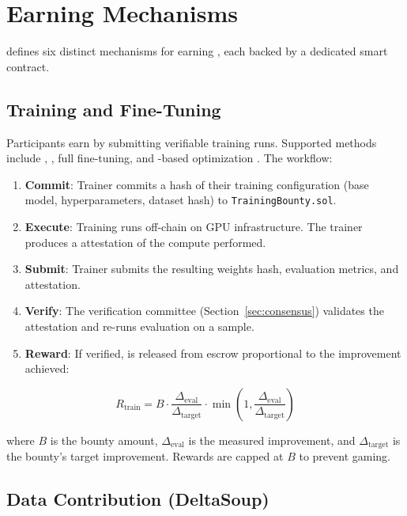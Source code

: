 \section{Earning Mechanisms}
\label{sec:earning}

\Beluga{} defines six distinct mechanisms for earning \BLG{}, each backed by a dedicated smart contract.

\subsection{Training and Fine-Tuning}

Participants earn \BLG{} by submitting verifiable training runs. Supported methods include \LoRA{}, \QLoRA{}, full fine-tuning, and \GRPO{}-based optimization \cite{zoo-gym}. The workflow:

\begin{enumerate}
    \item \textbf{Commit}: Trainer commits a hash of their training configuration (base model, hyperparameters, dataset hash) to \texttt{TrainingBounty.sol}.
    \item \textbf{Execute}: Training runs off-chain on GPU infrastructure. The trainer produces a \TEE{} attestation \cite{zoo-poai} of the compute performed.
    \item \textbf{Submit}: Trainer submits the resulting weights hash, evaluation metrics, and \TEE{} attestation.
    \item \textbf{Verify}: The \PoAI{} verification committee (Section~\ref{sec:consensus}) validates the attestation and re-runs evaluation on a sample.
    \item \textbf{Reward}: If verified, \BLG{} is released from escrow proportional to the improvement achieved:
\end{enumerate}

\begin{equation}
R_{\text{train}} = B \cdot \frac{\Delta_{\text{eval}}}{\Delta_{\text{target}}} \cdot \min\left(1, \frac{\Delta_{\text{eval}}}{\Delta_{\text{target}}}\right)
\end{equation}

where $B$ is the bounty amount, $\Delta_{\text{eval}}$ is the measured improvement, and $\Delta_{\text{target}}$ is the bounty's target improvement. Rewards are capped at $B$ to prevent gaming.

\subsection{Data Contribution (DeltaSoup)}

